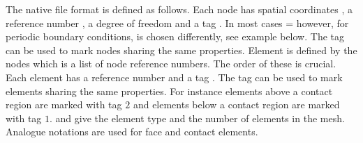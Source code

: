 The native \finley file format is defined as follows.
Each node  has  spatial coordinates , a reference
number , a degree of freedom  and a tag
.
In most cases = however, for periodic
boundary conditions,  is chosen differently, see example below.
The tag can be used to mark nodes sharing the same properties.
Element  is defined by the  nodes
 which is a list of node reference numbers.
The order of these is crucial. Each element has a reference number
 and a tag .
The tag can be used to mark elements sharing the same properties.
For instance elements above a contact region are marked with tag $2$ and
elements below a contact region are marked with tag $1$.
 and  give the element type and the number
of elements in the mesh.
Analogue notations are used for face and contact elements.

